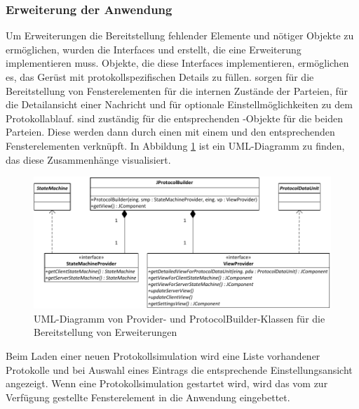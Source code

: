 \subsubsection{Erweiterung der Anwendung}
Um Erweiterungen die Bereitstellung fehlender Elemente und nötiger Objekte zu ermöglichen, wurden die Interfaces  und  erstellt, die eine Erweiterung implementieren muss. Objekte, die diese Interfaces implementieren, ermöglichen es, das Gerüst mit protokollspezifischen Details zu füllen.  sorgen für die Bereitstellung von Fensterelementen für die internen Zustände der Parteien, für die Detailansicht einer Nachricht und für optionale Einstellmöglichkeiten zu dem Protokollablauf.  sind zuständig für die entsprechenden -Objekte für die beiden Parteien. Diese werden dann durch einen  mit einem  und den entsprechenden Fensterelementen verknüpft. In Abbildung \ref{fig_uml_abstract_provider_builder} ist ein UML-Diagramm zu finden, das diese Zusammenhänge visualisiert. 

\begin{figure}
	\centering
	\includegraphics[scale=0.9]{Diagrams/uml/abstract_provider_builder.pdf} %
	\caption{UML-Diagramm von Provider- und ProtocolBuilder-Klassen für die Bereitstellung von Erweiterungen}
	\label{fig_uml_abstract_provider_builder}
\end{figure}

Beim Laden einer neuen Protokollsimulation wird eine Liste vorhandener Protokolle und bei Auswahl eines Eintrags die entsprechende Einstellungsansicht angezeigt. Wenn eine Protokollsimulation gestartet wird, wird das vom  zur Verfügung gestellte Fensterelement in die Anwendung eingebettet.

